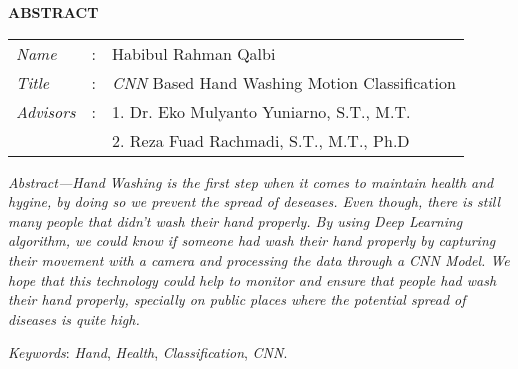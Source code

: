 \begin{center}
  \large\textbf{ABSTRACT}
\end{center}


\vspace{2ex}

\begingroup
  \setlength{\tabcolsep}{0pt}

  \noindent
  \begin{tabularx}{\textwidth}{l >{\centering}m{3em} X}
    \emph{Name}     &:&	Habibul Rahman Qalbi\\

    \emph{Title}    &:& \emph{CNN} Based Hand Washing Motion Classification \\

    \emph{Advisors} &:& 1. Dr. Eko Mulyanto Yuniarno, S.T., M.T. \\
    				& & 2. Reza Fuad Rachmadi, S.T., M.T., Ph.D \\
  \end{tabularx}
\endgroup

\emph{Abstract—Hand Washing is the first step when it comes to maintain health and hygine, by doing so we prevent the spread of deseases. Even though, there is still many people that didn’t wash their hand properly. By using Deep Learning algorithm, we could know if someone had wash their hand properly by capturing their movement with a camera and processing the data through a CNN Model. We hope that this technology could help to monitor and ensure that people had wash their hand properly, specially on public places where the potential spread of diseases is quite high.}

\emph{Keywords}: \emph{Hand}, \emph{Health}, \emph{Classification}, \emph{CNN}.
